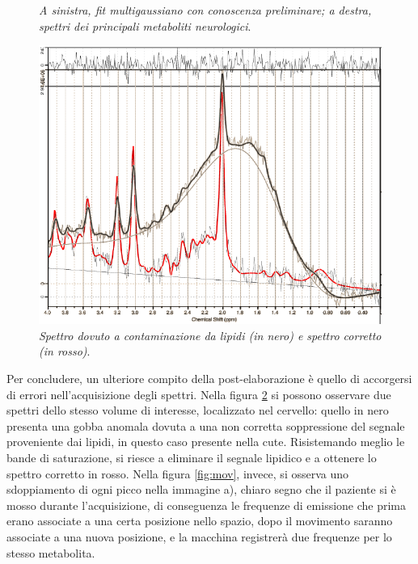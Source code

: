 \documentclass{report}
\newcommand{\figref}[1]{figura \ref{#1}}
\numberwithin{equation}{section}
\numberwithin{figure}{section}
\begin{document}
\begin{figure}[htp]
\caption{\label{fig:fit} \textit{A sinistra, fit multigaussiano con conoscenza preliminare; a destra, spettri dei principali metaboliti neurologici}.}
\end{figure}

\begin{figure}[htp]
\centering
\includegraphics[scale=0.87]{immagini/gobba.png}
\caption{\label{fig:gobba} \textit{Spettro dovuto a contaminazione da lipidi (in nero) e spettro corretto (in rosso)}.}
\end{figure}

Per concludere, un ulteriore compito della post-elaborazione è quello di accorgersi di errori nell'acquisizione degli spettri. Nella \figref{fig:gobba} si possono osservare due spettri dello stesso volume di interesse, localizzato nel cervello: quello in nero presenta una gobba anomala dovuta a una non corretta soppressione del segnale proveniente dai lipidi, in questo caso presente nella cute. Risistemando meglio le bande di saturazione, si riesce a eliminare il segnale lipidico e a ottenere lo spettro corretto in rosso.
Nella \figref{fig:mov}, invece, si osserva uno sdoppiamento di ogni picco nella immagine a), chiaro segno che il paziente si è mosso durante l'acquisizione, di conseguenza le frequenze di emissione che prima erano associate a una certa posizione nello spazio, dopo il movimento saranno associate a una nuova posizione, e la macchina registrerà due frequenze per lo stesso metabolita.
\end{document}
